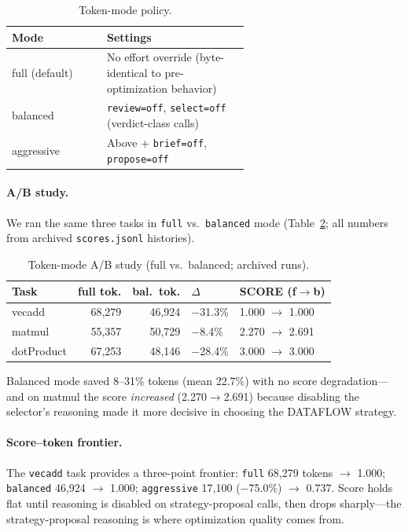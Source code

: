 \documentclass[10pt,conference,letterpaper]{IEEEtran}
\begin{document}
\begin{table}[h]
\centering
\caption{Token-mode policy.}
\label{tab:tokenmode}
\small
\begin{tabular}{lp{0.6\linewidth}}
\toprule
\textbf{Mode} & \textbf{Settings} \\
\midrule
full (default) & No effort override (byte-identical to pre-optimization behavior) \\
balanced & \texttt{review=off}, \texttt{select=off} (verdict-class calls) \\
aggressive & Above + \texttt{brief=off}, \texttt{propose=off} \\
\bottomrule
\end{tabular}
\end{table}

\paragraph{A/B study.} We ran the same three tasks in \texttt{full} vs.\ \texttt{balanced} mode (Table~\ref{tab:ab}; all numbers from archived \texttt{scores.jsonl} histories).

\begin{table}[h]
\centering
\caption{Token-mode A/B study (full vs.\ balanced; archived runs).}
\label{tab:ab}
\small
\begin{tabular}{lrrll}
\toprule
\textbf{Task} & \textbf{full tok.} & \textbf{bal.\ tok.} & \textbf{$\Delta$} & \textbf{SCORE (f$\to$b)} \\
\midrule
vecadd & 68,279 & 46,924 & $-$31.3\% & 1.000 $\to$ 1.000 \\
matmul & 55,357 & 50,729 & $-$8.4\% & 2.270 $\to$ 2.691 \\
dotProduct & 67,253 & 48,146 & $-$28.4\% & 3.000 $\to$ 3.000 \\
\bottomrule
\end{tabular}
\end{table}

Balanced mode saved 8--31\% tokens (mean 22.7\%) with no score degradation---and on matmul the score \emph{increased} (2.270$\to$2.691) because disabling the selector's reasoning made it more decisive in choosing the DATAFLOW strategy.

\paragraph{Score--token frontier.} The \texttt{vecadd} task provides a three-point frontier: \texttt{full} 68,279 tokens $\to$ 1.000; \texttt{balanced} 46,924 $\to$ 1.000; \texttt{aggressive} 17,100 ($-$75.0\%) $\to$ 0.737. Score holds flat until reasoning is disabled on strategy-proposal calls, then drops sharply---the strategy-proposal reasoning is where optimization quality comes from.
\end{document}
